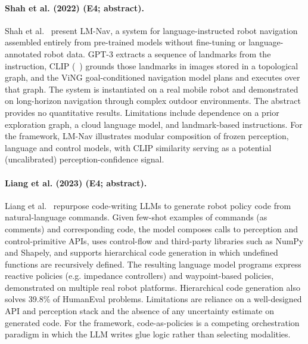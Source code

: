 \documentclass[10pt,a4paper]{article}
\begin{document}
\paragraph{Shah et al. (2022) (E4; abstract).} Shah et al.~\cite{Shah2022} present LM-Nav, a system for language-instructed robot navigation assembled entirely from pre-trained models without fine-tuning or language-annotated robot data. GPT-3 extracts a sequence of landmarks from the instruction, CLIP (~\cite{Radford2021}) grounds those landmarks in images stored in a topological graph, and the ViNG goal-conditioned navigation model plans and executes over that graph. The system is instantiated on a real mobile robot and demonstrated on long-horizon navigation through complex outdoor environments. The abstract provides no quantitative results. Limitations include dependence on a prior exploration graph, a cloud language model, and landmark-based instructions. For the framework, LM-Nav illustrates modular composition of frozen perception, language and control models, with CLIP similarity serving as a potential (uncalibrated) perception-confidence signal.

\paragraph{Liang et al. (2023) (E4; abstract).} Liang et al.~\cite{Liang2023} repurpose code-writing LLMs to generate robot policy code from natural-language commands. Given few-shot examples of commands (as comments) and corresponding code, the model composes calls to perception and control-primitive APIs, uses control-flow and third-party libraries such as NumPy and Shapely, and supports hierarchical code generation in which undefined functions are recursively defined. The resulting language model programs express reactive policies (e.g. impedance controllers) and waypoint-based policies, demonstrated on multiple real robot platforms. Hierarchical code generation also solves 39.8\% of HumanEval problems. Limitations are reliance on a well-designed API and perception stack and the absence of any uncertainty estimate on generated code. For the framework, code-as-policies is a competing orchestration paradigm in which the LLM writes glue logic rather than selecting modalities.
\end{document}

